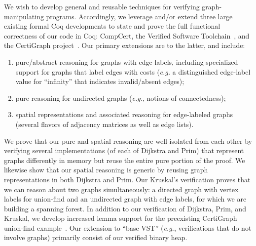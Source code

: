 We wish to develop general and reusable techniques for verifying graph-manipulating programs.  Accordingly, we leverage and/or extend three large existing formal Coq developments to state and prove the full functional correctness of our code in Coq: CompCert, the Verified Software Toolchain~\cite{appel:programlogics}, and the CertiGraph project~\cite{DBLP:journals/pacmpl/WangCMH19}.  Our primary extensions are to the latter, and include:
\begin{enumerate}
\item pure/abstract reasoning for graphs with edge labels, including specialized support for graphs that label edges with costs (\emph{e.g.} a distinguished edge-label value for ``infinity'' that indicates invalid/absent edges);
\item pure reasoning for undirected graphs (\emph{e.g.}, notions of connectedness);
\item spatial representations and associated reasoning for edge-labeled graphs (several flavors of adjacency matrices as well as edge lists).
\end{enumerate}
We prove that our pure and spatial reasoning are well-isolated from each other by verifying several implementations (of each of Dijkstra and Prim) that represent graphs differently in memory but reuse the entire pure portion of the proof.  We likewise show that our spatial reasoning is generic by reusing graph representations in both Dijkstra and Prim.  Our Kruskal's verification proves that we can reason about two graphs simultaneously: a directed graph with vertex labels for union-find and an undirected graph with edge labels, for which we are building a spanning forest.
In addition to our verification of Dijkstra, Prim, and Kruskal, we develop increased lemma support for the preexisting CertiGraph union-find example~\cite{DBLP:journals/pacmpl/WangCMH19}.  Our extension to ``base VST'' (\emph{e.g.}, verifications that do not involve graphs) primarily consist of our verified binary heap.



